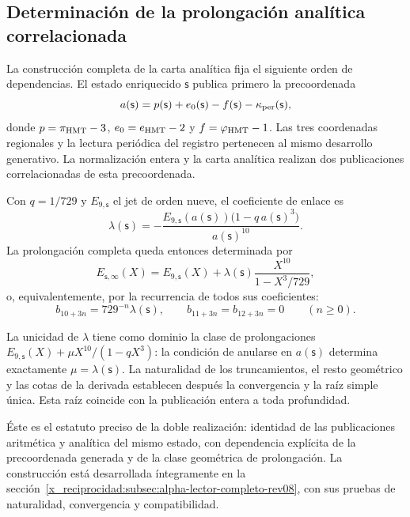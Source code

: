 \subsection*{Determinación de la prolongación analítica correlacionada}

La construcción completa de la carta analítica fija el siguiente orden
de dependencias. El estado enriquecido $\mathsf s$ publica primero la
precoordenada
\[
 a(\mathsf s)=p(\mathsf s)+e_0(\mathsf s)-f(\mathsf s)
              -\kappa_{\rm per}(\mathsf s),
\]
donde $p=\pi_{\rm HMT}-3$, $e_0=e_{\rm HMT}-2$ y
$f=\varphi_{\rm HMT}-1$. Las tres coordenadas regionales y la lectura
periódica del registro pertenecen al mismo desarrollo generativo.
La normalización entera y la carta analítica realizan dos publicaciones
correlacionadas de esta precoordenada.

Con $q=1/729$ y $E_{9,\mathsf s}$ el jet de orden nueve, el coeficiente
de enlace es
\[
 \lambda(\mathsf s)=
 -\frac{E_{9,\mathsf s}(a(\mathsf s))
         \bigl(1-q\,a(\mathsf s)^3\bigr)}{a(\mathsf s)^{10}}.
\]
La prolongación completa queda entonces determinada por
\[
 E_{\mathsf s,\infty}(X)=E_{9,\mathsf s}(X)
      +\lambda(\mathsf s)\frac{X^{10}}{1-X^3/729},
\]
o, equivalentemente, por la recurrencia de todos sus coeficientes:
\[
 b_{10+3n}=729^{-n}\lambda(\mathsf s),\qquad
 b_{11+3n}=b_{12+3n}=0\qquad(n\geq0).
\]

La unicidad de $\lambda$ tiene como dominio la clase de prolongaciones
$E_{9,\mathsf s}(X)+\mu X^{10}/(1-qX^3)$: la condición de anularse en
$a(\mathsf s)$ determina exactamente $\mu=\lambda(\mathsf s)$.
La naturalidad de los truncamientos, el resto geométrico y las cotas de
la derivada establecen después la convergencia y la raíz simple única.
Esta raíz coincide con la publicación entera a toda profundidad.

Éste es el estatuto preciso de la doble realización: identidad de las
publicaciones aritmética y analítica del mismo estado, con dependencia
explícita de la precoordenada generada y de la clase geométrica de
prolongación. La construcción está desarrollada íntegramente en la
sección~\ref{x_reciprocidad:subsec:alpha-lector-completo-rev08},
con sus pruebas de naturalidad, convergencia y compatibilidad.
